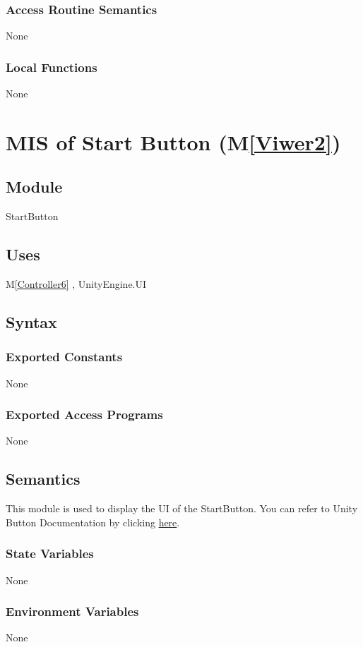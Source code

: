 \documentclass[12pt, titlepage]{article}
\newcommand{\mref}[1]{M\ref{#1}}
\begin{document}
\subsubsection{Access Routine Semantics}
None
\subsubsection{Local Functions}
None


\newpage


\newcommand{\bref}{\href{https://docs.unity3d.com/Packages/com.unity.ugui@1.0/manual/script-Button.html}{here}}
\section{MIS of Start Button (\mref{Viwer2})}

\subsection{Module}
StartButton

\subsection{Uses}
\mref{Controller6} , 
UnityEngine.UI

\subsection{Syntax}
\subsubsection{Exported Constants}
None
\subsubsection{Exported Access Programs}
None

\subsection{Semantics}
This module is used to display the UI of the StartButton. You can refer to Unity Button Documentation by clicking \bref.
\subsubsection{State Variables}
None
\subsubsection{Environment Variables}
None
\end{document}
